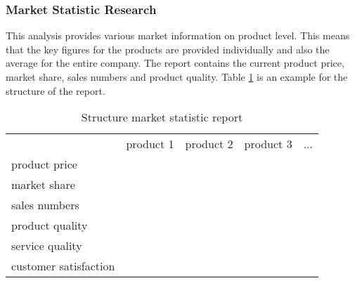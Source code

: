 \subsubsection{Market Statistic Research}
This analysis provides various market information on product level. This means that the key figures for the products are provided individually and also the average for the entire company. The report contains the current product price, market share, sales numbers and product quality. Table \ref{MR_market_statistic} is an example for the structure of the report. 

\begin{table}[ht]
\centering
\begin{tabular}{|l|r|r|r|r|}
\hline
                        & product 1   & product 2  & product 3 & ...       \\
product price           &             &            &           &           \\
market share            &             &            &           &           \\
sales numbers           &             &            &           &           \\
product quality         &             &            &           &           \\
service quality         &             &            &           &           \\
customer satisfaction   &             &            &           &           \\
\hline
\end{tabular}
\caption{Structure market statistic report}
\label{MR_market_statistic}
\end{table}
